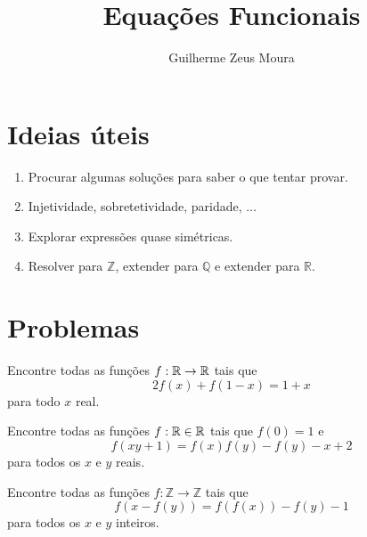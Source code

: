 \documentclass[10pt,a4paper]{article}
\title{Equações Funcionais}
\author{Guilherme Zeus Moura}
\begin{document}
	
	\zeustitle
	\section{Ideias úteis}
	\begin{enumerate}[label = \textcolor{sec2-}{(\alph*)}]
		\item Procurar algumas soluções para saber o que tentar provar.
		\item Injetividade, sobretetividade, paridade, $\dots$
		\item Explorar expressões quase simétricas.
		\item Resolver para $\mathbb{Z}$, extender para $\mathbb{Q}$ e extender para $\mathbb{R}$.
	\end{enumerate}
	\section{Problemas}
	\begin{prob}
		Encontre todas as funções $f: \mathbb{R} \to \mathbb{R}$ tais que
		$$ 2f(x) + f(1-x) = 1 + x$$
		para todo $x$ real.
	\end{prob}
	\begin{prob}
		Encontre todas as funções $f: \mathbb{R} \in \mathbb{R}$ tais que $f(0) = 1$ e
		$$ f(xy + 1) = f(x)f(y) - f(y) - x + 2$$
		para todos os $x$ e $y$ reais.
	\end{prob}
	\begin{prob}
		Encontre todas as funções $f: \mathbb{Z} \to \mathbb{Z}$ tais que
		$$ f(x - f(y)) = f(f(x)) - f(y) - 1$$
		para todos os $x$ e $y$ inteiros.
	\end{prob}
\end{document}
